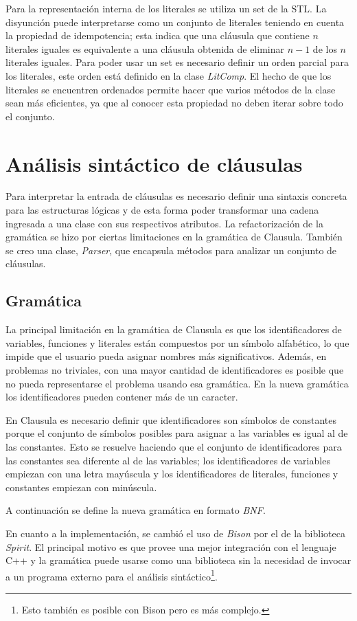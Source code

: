 \documentclass[a4paper,12pt]{article}
\begin{document}
Para la representación interna de los literales se utiliza un set de la STL. La disyunción puede interpretarse como
un conjunto de literales teniendo en cuenta la propiedad de idempotencia; esta indica que una cláusula que contiene
$n$ literales iguales es equivalente a una cláusula obtenida de eliminar $n-1$ de los $n$ literales iguales. Para poder usar
un set es necesario definir un orden parcial para los literales, este orden está definido en la clase \emph{LitComp}.
El hecho de que los literales se encuentren ordenados permite hacer que varios métodos de la clase sean más eficientes,
ya que al conocer esta propiedad no deben iterar sobre todo el conjunto.
\section{Análisis sintáctico de cláusulas} %
Para interpretar la entrada de cláusulas es necesario definir una sintaxis concreta para las estructuras
lógicas y de esta forma poder transformar una cadena ingresada a una clase con sus respectivos atributos.
La refactorización de la gramática se hizo por ciertas limitaciones en la gramática de Clausula. También
se creo una clase, \emph{Parser}, que encapsula métodos para analizar un conjunto de cláusulas.
\subsection{Gramática}
La principal limitación en la gramática de Clausula es que los identificadores de variables, funciones y literales
están compuestos por un símbolo alfabético, lo que impide que el usuario pueda asignar nombres más significativos. Además,
en problemas no triviales, con una mayor cantidad de identificadores es posible que no pueda representarse el problema
usando esa gramática. En la nueva gramática los identificadores pueden contener más de un caracter.

En Clausula es necesario definir que identificadores son símbolos de constantes porque el conjunto
de símbolos posibles para asignar a las variables es igual al de las constantes. Esto se resuelve haciendo
que el conjunto de identificadores para las constantes sea diferente al de las variables; los
identificadores de variables empiezan con una letra mayúscula y los identificadores de literales, funciones y constantes
empiezan con minúscula.

A continuación se define la nueva gramática en formato \emph{BNF}.

En cuanto a la implementación, se cambió el uso de \emph{Bison} por el de la biblioteca \emph{Spirit}\cite{spirit}.
El principal motivo es que provee una mejor integración con el lenguaje C++ y la gramática puede usarse como una biblioteca
sin la necesidad de invocar a un programa externo para el análisis sintáctico\footnote{Esto también es posible con Bison pero es más complejo.}.
\end{document}
